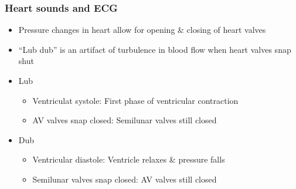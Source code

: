 \documentclass[11pt,fleqn]{book} %
\begin{document}
\subsubsection{Heart sounds and ECG}
\begin{itemize}
    \item Pressure changes in heart
allow for opening \& closing of
heart valves
    \item \enquote{Lub dub} is an artifact of
turbulence in blood flow
when heart valves snap shut
\end{itemize}
\begin{itemize}
    \item Lub
    \begin{itemize}
        \item Ventriculat systole: First phase of
ventricular contraction
        \item AV valves snap closed: Semilunar valves still
closed
    \end{itemize}
    \item Dub
    \begin{itemize}
        \item Ventricular diastole: Ventricle relaxes \&
pressure falls
        \item Semilunar valves snap closed: AV valves still closed
    \end{itemize}
\end{itemize}
\end{document}
